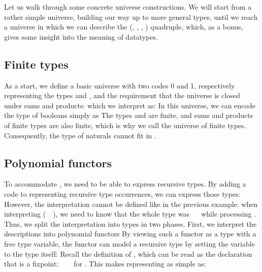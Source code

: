 Let us walk through some concrete universe constructions. We will start from a rather simple universe, building our way up to more general types, until we reach a universe in which we can describe the (\bN{}, , , ) quadruple, which, as a bonus, gives some insight into the meaning of datatypes.

\subsection{Finite types}\label{ssec:background-fin}
As a start, we define a basic universe with two codes 0 and 1, respectively representing the types  and , and the requirement that the universe is closed under sums and products:
which we interpret as:
In this universe, we can encode the type of booleans simply as 
The types  and  are finite, and sums and products of finite types are also finite, which is why we call  the universe of finite types. Consequently, the type of naturals \bN{} cannot fit in .

\subsection{Polynomial functors}\label{ssec:background-rec}
To accommodate \bN{}, we need to be able to express recursive types. By adding a code  to  representing recursive type occurrences, we can express those types: 
However, the interpretation cannot be defined like in the previous example: when interpreting (\ \ ), we need to know that the whole type was \ \  while processing . Thus, we split the interpretation into types in two phases. First, we interpret the descriptions into polynomial functors
By viewing such a functor as a type with a free type variable, the functor can model a recursive type by setting the variable to the type itself:
Recall the definition of \bN{}, which can be read as the declaration that  is a fixpoint: \ \ \  for . This makes representing \bN{} as simple as:


